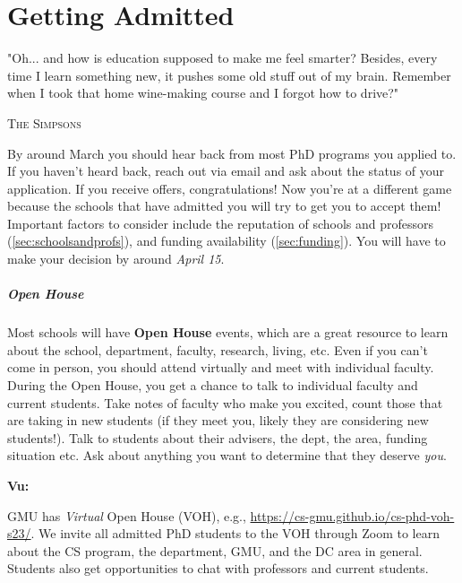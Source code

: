 \documentclass[oneside,11pt]{memoir}
\newenvironment{commentbox}[1][]{
  \small
  \begin{mybox}
    {\small \textbf{#1}}
  }{
  \end{mybox}
}
\begin{document}
%


\chapter{Getting Admitted}\label{sec:accepted}

\epigraph{"Oh... and how is education supposed to make me feel smarter? Besides, every time I learn something new, it pushes some old stuff out of my brain. Remember when I took that home wine-making course and I forgot how to drive?"}{\textsc{The Simpsons}}

By around March you should hear back from most PhD programs you applied to. If you haven't heard back, reach out via email and ask about the status of your application.
If you receive offers, congratulations!  Now you're at a different game because the schools that have admitted you will try to get you to accept them!  Important factors to consider include the reputation of schools and professors (\autoref{sec:schoolsandprofs}), and funding availability (\autoref{sec:funding}). You will have to make your decision by around \emph{April 15}.

\paragraph{Open House} Most schools will have \textbf{Open House} events, which are a great resource to learn about the school, department, faculty, research, living, etc. Even if you can't come in person, you should attend virtually and meet with individual faculty.
During the Open House, you get a chance to talk to individual faculty and current students.  Take notes of faculty who make you excited, count those that are taking in new students (if they meet you, likely they are considering new students!).  Talk to students about their advisers, the dept, the area, funding situation etc.  Ask about anything you want to determine that they deserve \emph{you}.

\begin{commentbox}[Vu:]
  GMU has \emph{Virtual} Open House (VOH), e.g., \url{https://cs-gmu.github.io/cs-phd-voh-s23/}. We invite all admitted PhD students to the VOH through Zoom to learn about the CS program, the department, GMU, and the DC area in general. Students also get opportunities to chat with professors and current students.
\end{commentbox}
\end{document}
